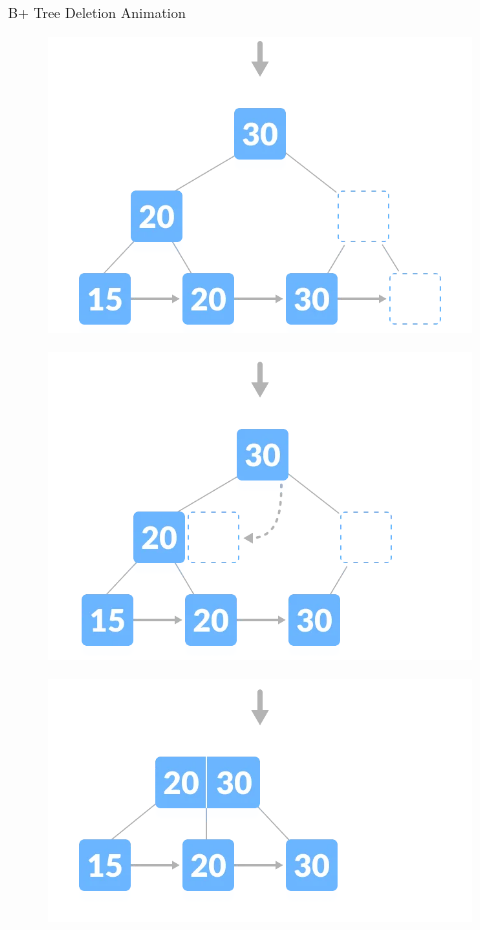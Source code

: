 \documentclass{beamer}
\begin{document}
\begin{frame}{B+ Tree Deletion Animation}
\begin{table}[h]
\begin{overprint}
\begin{figure}
              \includegraphics[scale=0.4]{Images/deletion-6.2.png}
        \end{figure}
        \begin{figure}
             \centering
             \includegraphics[scale=0.4]{Images/deletion-6.3.png}
        \end{figure}
        \begin{figure}
             \centering
             \includegraphics[scale=0.4]{Images/deletion-6.4.png}
        \end{figure}
        \end{overprint}
    \end{table} 
\end{frame}
\end{document}
